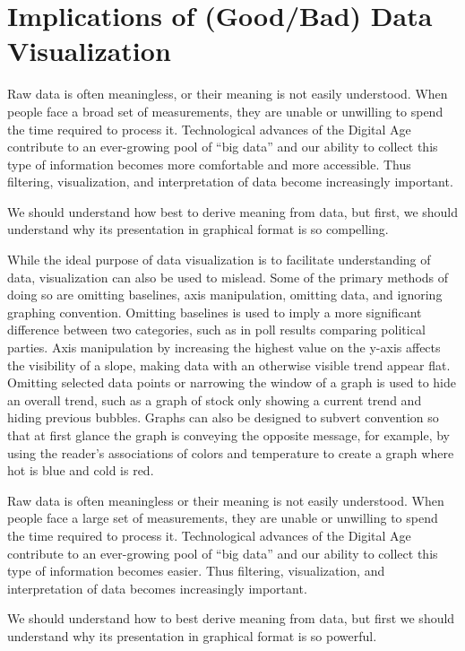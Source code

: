 \documentclass[]{book}
\theoremstyle{definition}
\theoremstyle{definition}
\theoremstyle{definition}
\theoremstyle{remark}
\begin{document}
\section{Implications of (Good/Bad) Data
Visualization}\label{implications-of-goodbad-data-visualization}

Raw data is often meaningless, or their meaning is not easily
understood. When people face a broad set of measurements, they are
unable or unwilling to spend the time required to process it.
Technological advances of the Digital Age contribute to an ever-growing
pool of ``big data'' and our ability to collect this type of information
becomes more comfortable and more accessible. Thus filtering,
visualization, and interpretation of data become increasingly important.

We should understand how best to derive meaning from data, but first, we
should understand why its presentation in graphical format is so
compelling.

While the ideal purpose of data visualization is to facilitate
understanding of data, visualization can also be used to mislead. Some
of the primary methods of doing so are omitting baselines, axis
manipulation, omitting data, and ignoring graphing convention. Omitting
baselines is used to imply a more significant difference between two
categories, such as in poll results comparing political parties. Axis
manipulation by increasing the highest value on the y-axis affects the
visibility of a slope, making data with an otherwise visible trend
appear flat. Omitting selected data points or narrowing the window of a
graph is used to hide an overall trend, such as a graph of stock only
showing a current trend and hiding previous bubbles. Graphs can also be
designed to subvert convention so that at first glance the graph is
conveying the opposite message, for example, by using the reader's
associations of colors and temperature to create a graph where hot is
blue and cold is red.

Raw data is often meaningless or their meaning is not easily understood.
When people face a large set of measurements, they are unable or
unwilling to spend the time required to process it. Technological
advances of the Digital Age contribute to an ever-growing pool of ``big
data'' and our ability to collect this type of information becomes
easier. Thus filtering, visualization, and interpretation of data
becomes increasingly important.

We should understand how to best derive meaning from data, but first we
should understand why its presentation in graphical format is so
powerful.
\end{document}
